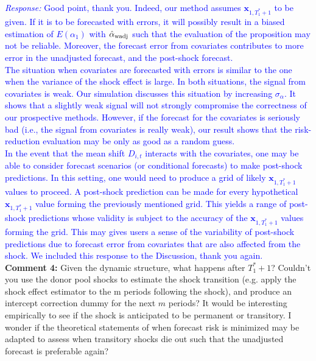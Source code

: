 \documentclass[12pt]{article}
\newcommand{\response}[1]{\noindent \textcolor{blue}{\emph{Response:} #1}}
\begin{document}
\response{Good point, thank you. Indeed, our method assumes $\mathbf{x}_{1, T_1^* + 1}$ to be given. If it is to be forecasted with errors, it will possibly result in a biased estimation of $E(\alpha_1)$ with $\hat{\alpha}_{\rm wadj}$ such that the evaluation of the proposition may not be reliable. Moreover, the forecast error from covariates contributes to more error in the unadjusted forecast, and the post-shock forecast. \\

The situation when covariates are forecasted with errors is similar to the one when the variance of the shock effect is large. In both situations, the signal from covariates is weak. Our simulation discusses this situation by increasing $\sigma_{\alpha}$. It shows that a slightly weak signal will not strongly compromise the correctness of our prospective methods. However, if the forecast for the covariates is seriously bad (i.e., the signal from covariates is really weak), our result shows that the risk-reduction evaluation may be only as good as a random guess. \\

In the event that the mean shift $D_{i,t}$ interacts with the covariates, one may be able to consider forecast scenarios (or conditional forecasts) \citep{baumeister2014real} to make post-shock predictions. In this setting, one would need to produce a grid of likely $\mathbf{x}_{1, T_1^* + 1}$ values to proceed. A post-shock prediction can be made for every hypothetical $\mathbf{x}_{1, T_1^* + 1}$ value forming the previously mentioned grid. This yields a range of post-shock predictions whose validity is subject to the accuracy of the $\mathbf{x}_{1, T_1^* + 1}$ values forming the grid. This may gives users a sense of the variability of post-shock predictions due to forecast error from covariates that are also affected from the shock. We included this response to the Discussion, thank you again.} \\

{\bf Comment 4:} Given the dynamic structure, what happens after $T_1^*+1$? Couldn't you use the donor pool shocks to estimate the shock transition (e.g. apply the shock effect estimator to the m periods following the shock), and produce an intercept correction dummy for the next $m$ periods? It would be interesting empirically to see if the shock is anticipated to be permanent or transitory. I wonder if the theoretical statements of when forecast risk is minimized may be adapted to assess when transitory shocks die out such that the unadjusted forecast is preferable again? \\
\end{document}
